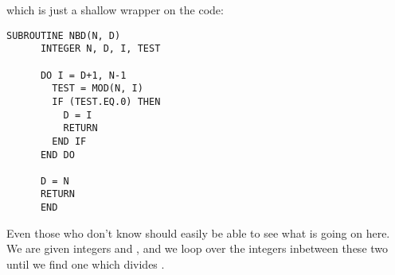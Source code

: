 which is just a shallow wrapper on the  code:

\begin{lstlisting}[language=ft,title=NBD]
      SUBROUTINE NBD(N, D)
      INTEGER N, D, I, TEST
      
      DO I = D+1, N-1
        TEST = MOD(N, I)
        IF (TEST.EQ.0) THEN
          D = I
          RETURN
        END IF
      END DO
      
      D = N
      RETURN
      END
\end{lstlisting}

Even those who don't know  should easily be able to see what is going on here.  We are given integers  and , and we loop over the integers inbetween these two until we find one which divides .
